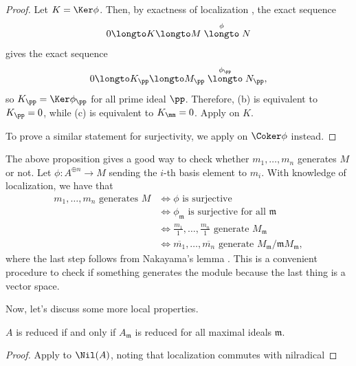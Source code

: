 \begin{proof}
    Let $K=\Ker\phi$. Then, by exactness of localization
    , the exact sequence
    $$0\longto K\longto M \stackrel\phi\longto N$$
    gives the exact sequence
    $$0\longto K_\pp\longto M_\pp\stackrel{\phi_\pp}\longto N_\pp,$$
    so $K_\pp = \Ker\phi_\pp$ for all prime ideal $\pp$.
    Therefore, (b) is equivalent to $K_\pp=0$,
    while (c) is equivalent to $K_\mm=0$.
    Apply  on $K$.

    To prove a similar statement for surjectivity,
    we apply  on $\Coker\phi$ instead.
\end{proof}
The above proposition gives a good way to check 
whether $m_1,\dots,m_n$ generates $M$ or not.
Let $\phi : A^{\oplus n}\to M$ sending the $i$-th
basis element to $m_i$.
With knowledge of localization, we have that
\begin{align*}
    m_1,\dots,m_n\text{ generates } M
    &\iff \phi\text{ is surjective} \\
    &\iff \phi_{\mathfrak m} \text{ is surjective for all }
    \mathfrak m \\
    &\iff \frac{m_1}{1},\dots,\frac{m_n}1\text{ generate }
    M_{\mathfrak m} \\
    &\iff \overline{m_1},\dots,\overline{m_n}
    \text{ generate } M_{\mathfrak m} / \mathfrak m M_{\mathfrak m},
\end{align*}
where the last step follows from Nakayama's lemma
.
This is a convenient procedure to check
if something generates the module
because the last thing is a vector space.


Now, let's discuss some more local properties.

\begin{corollary}
    $A$ is reduced if and only if $A_{\mathfrak m}$ is reduced for
    all maximal ideals $\mathfrak m$.
\end{corollary}
\begin{proof}
    Apply  to $\Nil(A)$,
    noting that localization commutes with nilradical
\end{proof}

